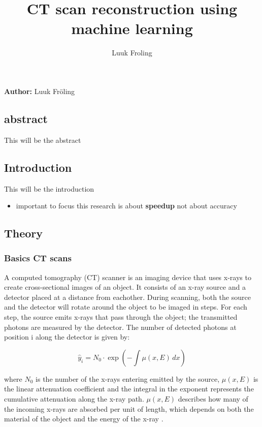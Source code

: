 \documentclass[9pt,Preprint]{lapreprint}
\title{CT scan reconstruction using machine learning}
\author[]{Luuk Froling}
\begin{document}
\maketitle


\textbf{Author:} Luuk Fröling

\subsection{abstract}

This will be the abstract

\subsection{Introduction}

This will be the introduction

\begin{itemize}
\item important to focus this research is about \textbf{speedup} not about accuracy
\end{itemize}

\subsection{Theory}

\subsubsection{Basics CT scans}

A computed tomography (CT) scanner is an imaging device that uses x-rays to create cross-sectional images of an object. It consists of an x-ray source and a detector placed at a distance from eachother. During scanning, both the source and the detector will rotate around the object to be imaged in steps. For each step, the source emits x-rays that pass through the object; the transmitted photons are measured by the detector. The number of detected photons at position i along the detector is given by:

\begin{equation}
\label{first }
\hat{y}_i  = N_0 \cdot \exp\left(-\int \mu(x, E) \, dx\right)
\end{equation}

where $N_0$ is the number of the x-rays entering emitted by the source, $\mu(x, E)$ is the linear attenuation coefficient and the integral in the exponent represents the cumulative attenuation along the x-ray path. $\mu(x, E)$ describes how many of the incoming x-rays are absorbed per unit of length, which depends on both the material of the object and the energy of the x-ray \parencite{kamalian2016ct_principles}.
\end{document}
